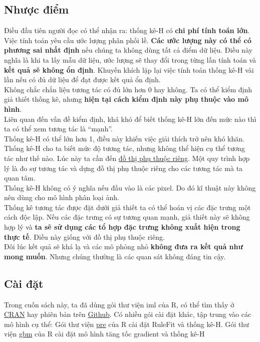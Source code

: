 \subsection{Nhược điểm}
Điều đầu tiên người đọc có thể nhận ra: thống kê-H có \textbf{chi phí tính toán lớn}.\\
Việc tính toán yêu cầu ước lượng phân phối lề. \textbf{Các ước lượng này có thể có phương sai nhất định} nếu chúng ta không dùng tất cả điểm dữ liệu. Điều này nghĩa là khi ta lấy mẫu dữ liệu, ước lượng sẽ thay đổi trong từng lần tính toán và \textbf{kết quả sẽ không ổn định}. Khuyến khích lặp lại việc tính toán thống kê-H vài lần nếu có đủ dữ liệu để đạt được kết quả ổn định.\\
Không chắc chắn liệu tương tác có đủ lớn hơn 0 hay không. Ta có thể kiểm định giả thiết thống kê, nhưng \textbf{hiện tại cách kiểm định này phụ thuộc vào mô hình}.\\
Liên quan đến vấn đề kiểm định, khá khó để biết thống kê-H lớn đến mức nào thì ta có thể xem tương tác là ``mạnh''.\\
Thống kê-H có thể lớn hơn 1, điều này khiến việc giải thích trở nên khó khăn.\\
Thống kê-H cho ta biết mức độ tương tác, nhưng không thể hiện cụ thể tương tác như thế nào. Lúc này ta cần đến \href{Chapter_5.1}{đồ thị phụ thuộc riêng}. Một quy trình hợp lý là đo sự tương tác và dựng đồ thị phụ thuộc riêng cho các tương tác mà ta quan tâm.\\
Thống kê-H không có ý nghĩa nếu đầu vào là các pixel. Do đó kĩ thuật này không nên dùng cho mô hình phân loại ảnh.\\
Thống kê tương tác được đặt dưới giả thiết ta có thể hoán vị các đặc trưng một cách độc lập. Nếu các đặc trưng có sự tương quan mạnh, giả thiết này sẽ không hợp lý và \textbf{ta sẽ sử dụng các tổ hợp đặc trưng không xuất hiện trong thực tế}. Điều này giống với đồ thị phụ thuộc riêng.\\
Đôi lúc kết quả sẽ khá lạ và các mô phỏng nhỏ \textbf{không đưa ra kết quả như mong muốn}. Nhưng chúng thường là các quan sát không đáng tin cậy.
\subsection{Cài đặt}
Trong cuốn sách này, ta đã dùng gói thư viện iml của R, có thể tìm thấy ở \href{https://cran.r-project.org/web/packages/iml/}{CRAN} hay phiên bản trên \href{https://github.com/christophM/iml}{Github}. Có nhiều gói cài đặt khác, tập trung vào các mô hình cụ thể: Gói thư viện \href{https://cran.r-project.org/web/packages/pre/index.html}{pre} của R cài đặt RuleFit và thống kê-H. Gói thư viện \href{https://github.com/gbm-developers/gbm3}{gbm} của R cài đặt mô hình tăng tốc gradient và thống kê-H
